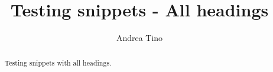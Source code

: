 \documentclass{article}
\begin{document}
\title{Testing snippets - All headings}
\author{Andrea Tino}

\maketitle

\begin{abstract}
Testing snippets with all headings.
\end{abstract}




\end{document}
